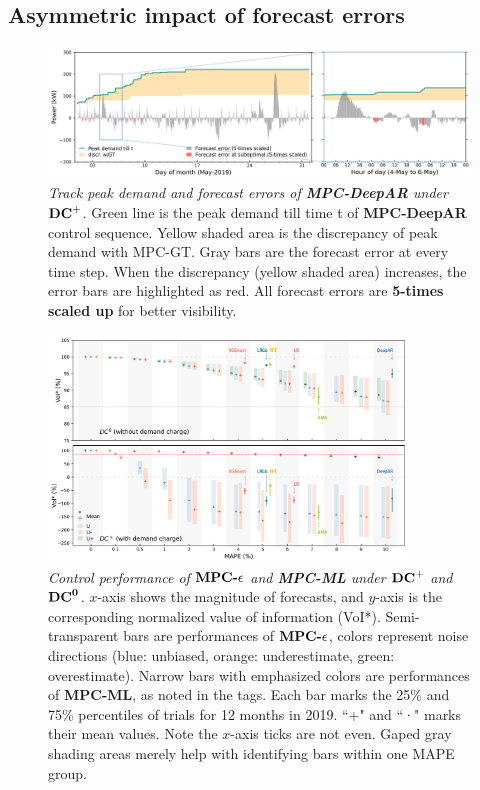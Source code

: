 \subsection{Asymmetric impact of forecast errors}
    \label{sec:Asymmetric impact}

\begin{figure}[!ht]
\centering
  \includegraphics[width=1\textwidth]{figures/fig-9-track-peak-demand-and-error5.png}
  \caption{\textit{Track peak demand and forecast errors of \textbf{MPC-DeepAR} under $\mathbf{{DC}^{+}}$}. Green line is the peak demand till time t of \textbf{MPC-DeepAR} control sequence. Yellow shaded area is the discrepancy of peak demand with MPC-GT. Gray bars are the forecast error at every time step. When the discrepancy (yellow shaded area) increases, the error bars are highlighted as red. All forecast errors are \textbf{5-times scaled up} for better visibility. }
  \label{fig:track-prak-demand}
\end{figure}


\begin{figure}[!ht]
\centering
  \includegraphics[width=0.85\textwidth]{figures/fig-4-VoI-artificial-noise-and-sota-models-combined 2.png}
  \caption{\textit{Control performance of $\textbf{MPC-${\epsilon }$}$ and \textbf{MPC-ML} under $\mathbf{{DC}^{+}}$ and $\mathbf{{DC}^{0}}$.} $x$-axis shows the magnitude of forecasts, and $y$-axis is the corresponding normalized value of information (VoI*). Semi-transparent bars are performances of $\textbf{MPC-${\epsilon }$}$, colors represent noise directions (blue: unbiased, orange: underestimate, green: overestimate). Narrow bars with emphasized colors are performances of \textbf{MPC-ML}, as noted in the tags. Each bar marks the 25\% and 75\% percentiles of trials for 12 months in 2019. ``+" and ``·" marks their mean values. Note the $x$-axis ticks are not even. Gaped gray shading areas merely help with identifying bars within one MAPE group.}
  \label{fig:VoI-group}
\end{figure}

